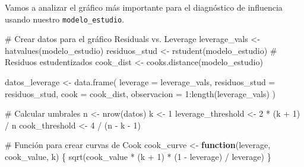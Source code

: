 \documentclass[
  letterpaper,
  DIV=11,
  numbers=noendperiod]{scrreprt}
\newenvironment{Shaded}{\begin{snugshade}}{\end{snugshade}}
\newcommand{\AttributeTok}[1]{\textcolor[rgb]{0.40,0.45,0.13}{#1}}
\newcommand{\CommentTok}[1]{\textcolor[rgb]{0.37,0.37,0.37}{#1}}
\newcommand{\ControlFlowTok}[1]{\textcolor[rgb]{0.00,0.23,0.31}{\textbf{#1}}}
\newcommand{\DecValTok}[1]{\textcolor[rgb]{0.68,0.00,0.00}{#1}}
\newcommand{\FunctionTok}[1]{\textcolor[rgb]{0.28,0.35,0.67}{#1}}
\newcommand{\NormalTok}[1]{\textcolor[rgb]{0.00,0.23,0.31}{#1}}
\newcommand{\OtherTok}[1]{\textcolor[rgb]{0.00,0.23,0.31}{#1}}
\newcommand{\SpecialCharTok}[1]{\textcolor[rgb]{0.37,0.37,0.37}{#1}}
\begin{document}
\begin{tcolorbox}[enhanced jigsaw, leftrule=.75mm, breakable, colbacktitle=quarto-callout-tip-color!10!white, bottomrule=.15mm, colframe=quarto-callout-tip-color-frame, toprule=.15mm, colback=white, coltitle=black, bottomtitle=1mm, left=2mm, title=\textcolor{quarto-callout-tip-color}{\faLightbulb}\hspace{0.5em}{Ejemplo: Gráfico Residuals vs.~Leverage}, opacityback=0, arc=.35mm, opacitybacktitle=0.6, toptitle=1mm, titlerule=0mm, rightrule=.15mm]

Vamos a analizar el gráfico más importante para el diagnóstico de
influencia usando nuestro \texttt{modelo\_estudio}.

\begin{Shaded}
\begin{Highlighting}[]
\CommentTok{\# Crear datos para el gráfico Residuals vs. Leverage}
\NormalTok{leverage\_vals }\OtherTok{\textless{}{-}} \FunctionTok{hatvalues}\NormalTok{(modelo\_estudio)}
\NormalTok{residuos\_stud }\OtherTok{\textless{}{-}} \FunctionTok{rstudent}\NormalTok{(modelo\_estudio)  }\CommentTok{\# Residuos estudentizados}
\NormalTok{cook\_dist }\OtherTok{\textless{}{-}} \FunctionTok{cooks.distance}\NormalTok{(modelo\_estudio)}

\NormalTok{datos\_leverage }\OtherTok{\textless{}{-}} \FunctionTok{data.frame}\NormalTok{(}
  \AttributeTok{leverage =}\NormalTok{ leverage\_vals,}
  \AttributeTok{residuos\_stud =}\NormalTok{ residuos\_stud,}
  \AttributeTok{cook =}\NormalTok{ cook\_dist,}
  \AttributeTok{observacion =} \DecValTok{1}\SpecialCharTok{:}\FunctionTok{length}\NormalTok{(leverage\_vals)}
\NormalTok{)}

\CommentTok{\# Calcular umbrales}
\NormalTok{n }\OtherTok{\textless{}{-}} \FunctionTok{nrow}\NormalTok{(datos)}
\NormalTok{k }\OtherTok{\textless{}{-}} \DecValTok{1}
\NormalTok{leverage\_threshold }\OtherTok{\textless{}{-}} \DecValTok{2} \SpecialCharTok{*}\NormalTok{ (k }\SpecialCharTok{+} \DecValTok{1}\NormalTok{) }\SpecialCharTok{/}\NormalTok{ n}
\NormalTok{cook\_threshold }\OtherTok{\textless{}{-}} \DecValTok{4} \SpecialCharTok{/}\NormalTok{ (n }\SpecialCharTok{{-}}\NormalTok{ k }\SpecialCharTok{{-}} \DecValTok{1}\NormalTok{)}

\CommentTok{\# Función para crear curvas de Cook}
\NormalTok{cook\_curve }\OtherTok{\textless{}{-}} \ControlFlowTok{function}\NormalTok{(leverage, cook\_value, k) \{}
  \FunctionTok{sqrt}\NormalTok{(cook\_value }\SpecialCharTok{*}\NormalTok{ (k }\SpecialCharTok{+} \DecValTok{1}\NormalTok{) }\SpecialCharTok{*}\NormalTok{ (}\DecValTok{1} \SpecialCharTok{{-}}\NormalTok{ leverage) }\SpecialCharTok{/}\NormalTok{ leverage)}
\NormalTok{\}}


\end{Highlighting}
\end{Shaded}
\end{tcolorbox}
\end{document}
